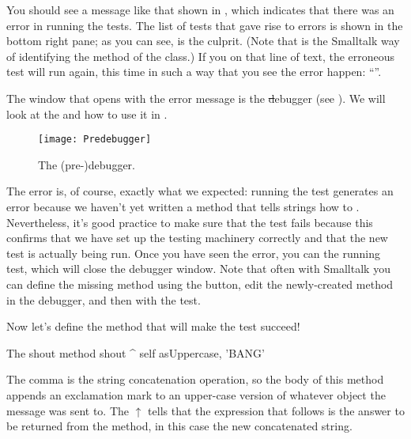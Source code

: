 \documentclass[a4paper,10pt,twoside]{book}
\begin{document}
You should see a message like that shown in , which indicates that there was an error in running the tests.  The list of tests that gave rise to errors is shown in the bottom right pane; as you can see,  is the culprit.
(Note that  is the Smalltalk way of identifying the  method of the  class.)
If you \click on that line of text, the erroneous test will run again, this time in such a way that you see the error happen: ``''.

The window that opens with the error message is the \st debugger (see ).
We will look at the  and how to use it in .

\begin{figure}[hbt]
\centerline {\texttt{[image: Predebugger]}}
\caption{The (pre-)debugger.}
\end{figure}

The error is, of course, exactly what we expected:  running the test generates an error because we haven't yet written a method that tells strings how to .  
Nevertheless, it's good practice to make sure that the test fails because this confirms that we have set up the testing machinery correctly and that the new test is actually being run.
Once you have seen the error, you can  the running test, which will close the debugger window.
Note that often with Smalltalk you can define the missing method using the  button, edit the newly-created method in the debugger, and then  with the test.

Now let's define the method that will make the test succeed!

\begin{method}[shout]{The shout method}
shout
	^ self asUppercase, 'BANG'
\end{method}

The comma is the string concatenation operation, so the body of this method appends an exclamation mark to an upper-case version of whatever  object the  message was sent to.
The $\uparrow$ tells \pharo that the expression that follows is the answer to be returned from the method, in this case the new concatenated string.
\end{document}

